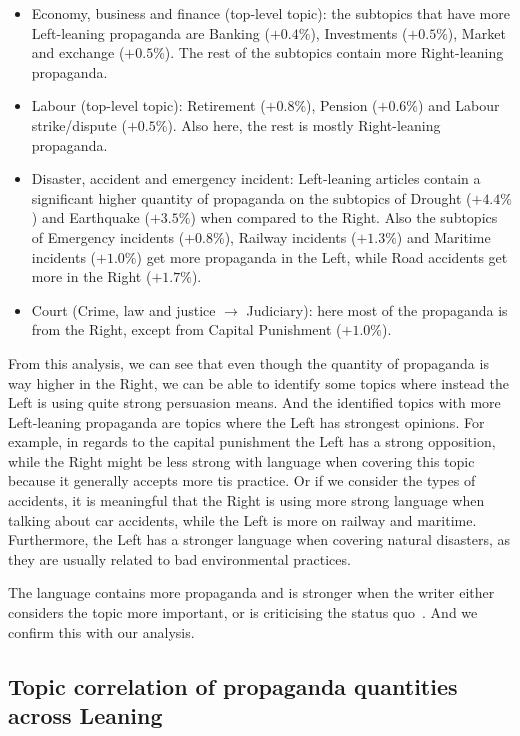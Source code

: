 \begin{itemize}
    \item Economy, business and finance (top-level topic): the subtopics that have more Left-leaning propaganda  are Banking ($+0.4\%$), Investments ($+0.5\%$), Market and exchange ($+0.5\%$). The rest of the subtopics contain more Right-leaning propaganda.
    \item Labour (top-level topic): Retirement ($+0.8\%$), Pension ($+0.6\%$) and Labour strike/dispute ($+0.5\%$). Also here, the rest is mostly Right-leaning propaganda.
    \item Disaster, accident and emergency incident: Left-leaning articles contain a significant higher quantity of propaganda on the subtopics of Drought ($+4.4\%$) and Earthquake ($+3.5\%$) when compared to the Right. Also the subtopics of Emergency incidents ($+0.8\%$), Railway incidents ($+1.3\%$) and Maritime incidents ($+1.0\%$) get more propaganda in the Left, while Road accidents get more in the Right ($+1.7\%$).
    \item Court (Crime, law and justice $\rightarrow$ Judiciary): here most of the propaganda is from the Right, except from Capital Punishment ($+1.0\%$).
\end{itemize}

From this analysis, we can see that even though the quantity of propaganda is way higher in the Right, we can be able to identify some topics where instead the Left is using quite strong persuasion means.
And the identified topics with more Left-leaning propaganda are topics where the Left has strongest opinions. For example, in regards to the capital punishment the Left has a strong opposition, while the Right might be less strong with language when covering this topic because it generally accepts more tis practice.
Or if we consider the types of accidents, it is meaningful that the Right is using more strong language when talking about car accidents, while the Left is more on railway and maritime. Furthermore, the Left has a stronger language when covering natural disasters, as they are usually related to bad environmental practices.

The language contains more propaganda and is stronger when the writer either considers the topic more important, or is criticising the status quo~\citep{rose1992political}. And we confirm this with our analysis.  


\subsection{\statusgreen Topic correlation of propaganda quantities across Leaning}
\label{ssec:topic_propaganda_leaning_tech_quantities}

